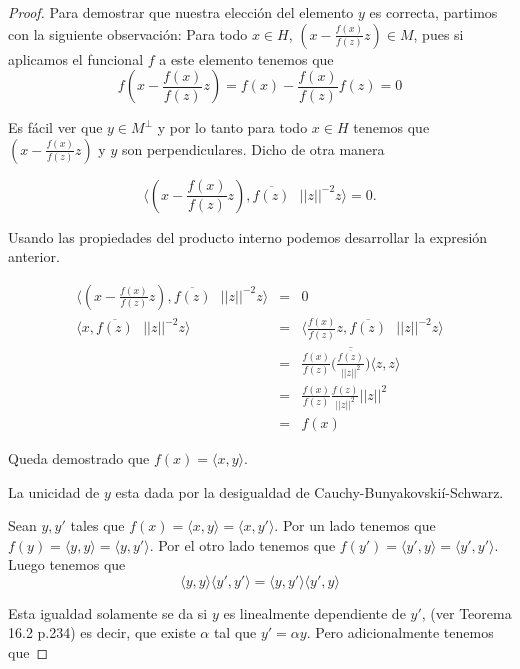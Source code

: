 \documentclass[letter,twoside,12pt]{article}
\numberwithin{equation}{section}
\begin{document}
\begin{enumerate}[label = (\textbf{\arabic*.})]
\begin{enumerate}[label = (\textbf{\alph*.})]
\begin{proof}
Para demostrar que nuestra elección del elemento $ y $ es correcta, partimos con la siguiente observación: Para todo $ x \in H $, $ (x - \frac{f(x)}{f(z)}z) \in M $, pues si aplicamos el funcional $ f $ a este elemento tenemos que
\begin{equation}
f(x - \frac{f(x)}{f(z)}z) = f(x)- \frac{f(x)}{f(z)}f(z) = 0
\end{equation}

Es fácil ver que $ y \in M^\perp $ y por lo tanto para todo $ x \in H $ tenemos que $ (x - \frac{f(x)}{f(z)}z) $ y $ y $ son perpendiculares. Dicho de otra manera

\begin{equation}
\langle (x - \frac{f(x)}{f(z)}z), \overline{f(z)}\text{ }||z||^{-2} z \rangle = 0.
\end{equation}

Usando las propiedades del producto interno podemos desarrollar la expresión anterior.

\begin{eqnarray*}
\langle (x - \frac{f(x)}{f(z)}z), \overline{f(z)}\text{ }||z||^{-2} z \rangle &=& 0
\\ \langle x , \overline{f(z)}\text{ }||z||^{-2} z \rangle &=& \langle \frac{f(x)}{f(z)}z , \overline{f(z)}\text{ }||z||^{-2} z \rangle
\\&=& \frac{f(x)}{f(z)} \overline{\bigg(\frac{\overline{f(z)}}{||z||^{2}}\bigg)} \langle z , z \rangle
\\&=& \frac{f(x)}{f(z)} \frac{f(z)}{||z||^{2}}||z||^2
\\&=& f(x) 
\end{eqnarray*}

Queda demostrado que $ f(x)= \langle x, y \rangle  $.

La unicidad de $ y $ esta dada por la desigualdad de Cauchy-Bunyakovskií-Schwarz.

Sean $ y,y' $ tales que $ f(x) = \langle x, y \rangle = \langle x, y' \rangle$. Por un lado tenemos que $ f(y) = \langle y, y \rangle = \langle y, y' \rangle  $. Por el otro lado tenemos que $ f(y') = \langle y', y \rangle = \langle y', y' \rangle  $. Luego tenemos que
\begin{equation}
\langle y, y \rangle \langle y', y' \rangle = \langle y, y' \rangle \langle y', y \rangle 
\end{equation}

Esta igualdad solamente se da si $ y $ es linealmente dependiente de $ y' $, (ver Teorema 16.2 p.234) es decir, que existe $ \alpha $ tal que $ y' = \alpha y $. Pero adicionalmente tenemos que


\end{proof}
\end{enumerate}
\end{enumerate}
\end{document}
